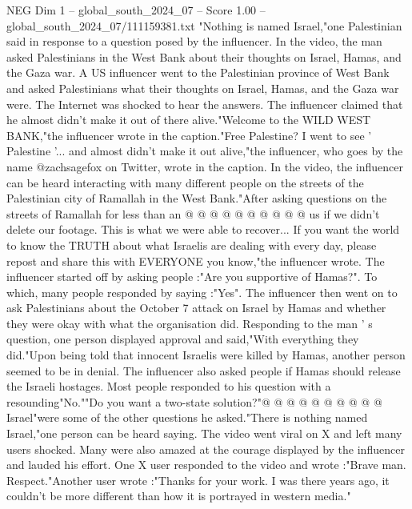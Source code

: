 \begin{textsample}{NEG Dim 1 – global\_south\_2024\_07 – Score 1.00 – global\_south\_2024\_07/111159381.txt}  \label{ex:f1_neg_278}
"Nothing is named Israel,"one Palestinian said in response to a question posed by the influencer.
In the video, the man asked Palestinians in the West Bank about their thoughts on Israel, Hamas, and the Gaza war.
A US influencer went to the Palestinian province of West Bank and asked Palestinians what their thoughts on Israel, Hamas, and the Gaza war were.
The Internet was shocked to hear the answers.
The influencer claimed that he almost didn't make it out of there alive."Welcome to the WILD WEST BANK,"the influencer wrote in the caption."Free Palestine?
I went to see ' Palestine '... and almost didn't make it out alive,"the influencer, who goes by the name @zachsagefox on Twitter, wrote in the caption.
In the video, the influencer can be heard interacting with many different people on the streets of the Palestinian city of Ramallah in the West Bank."After asking questions on the streets of Ramallah for less than an @ @ @ @ @ @ @ @ @ @ us if we didn't delete our footage.
This is what we were able to recover...
If you want the world to know the TRUTH about what Israelis are dealing with every day, please repost and share this with EVERYONE you know,"the influencer wrote.
The influencer started off by asking people :"Are you supportive of Hamas?".
To which, many people responded by saying :"Yes".
The influencer then went on to ask Palestinians about the October 7 attack on Israel by Hamas and whether they were okay with what the organisation did.
Responding to the man ' s question, one person displayed approval and said,"With everything they did."Upon being told that innocent Israelis were killed by Hamas, another person seemed to be in denial.
The influencer also asked people if Hamas should release the Israeli hostages.
Most people responded to his question with a resounding"No.""Do you want a two-state solution?"@ @ @ @ @ @ @ @ @ @ Israel"were some of the other questions he asked."There is nothing named Israel,"one person can be heard saying.
The video went viral on X and left many users shocked.
Many were also amazed at the courage displayed by the influencer and lauded his effort.
One X user responded to the video and wrote :"Brave man.
Respect."Another user wrote :"Thanks for your work.
I was there years ago, it couldn't be more different than how it is portrayed in western media."

\end{textsample}

